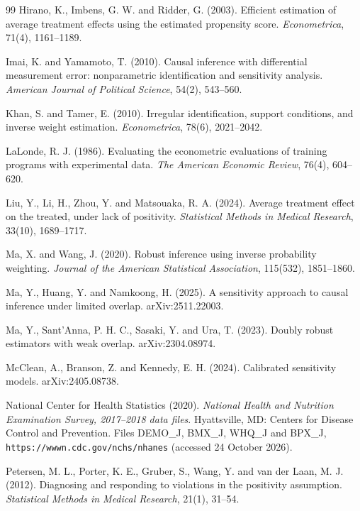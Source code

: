 \documentclass[11pt,a4paper]{article}
\theoremstyle{plain}
\theoremstyle{definition}
\begin{document}
\begin{thebibliography}{99}
 Hirano, K., Imbens, G. W. and Ridder, G. (2003). Efficient estimation of average treatment effects using the estimated propensity score. \emph{Econometrica}, 71(4), 1161--1189.

 Imai, K. and Yamamoto, T. (2010). Causal inference with differential measurement error: nonparametric identification and sensitivity analysis. \emph{American Journal of Political Science}, 54(2), 543--560.

 Khan, S. and Tamer, E. (2010). Irregular identification, support conditions, and inverse weight estimation. \emph{Econometrica}, 78(6), 2021--2042.

 LaLonde, R. J. (1986). Evaluating the econometric evaluations of training programs with experimental data. \emph{The American Economic Review}, 76(4), 604--620.

 Liu, Y., Li, H., Zhou, Y. and Matsouaka, R. A. (2024). Average treatment effect on the treated, under lack of positivity. \emph{Statistical Methods in Medical Research}, 33(10), 1689--1717.

 Ma, X. and Wang, J. (2020). Robust inference using inverse probability weighting. \emph{Journal of the American Statistical Association}, 115(532), 1851--1860.

 Ma, Y., Huang, Y. and Namkoong, H. (2025). A sensitivity approach to causal inference under limited overlap. arXiv:2511.22003.

 Ma, Y., Sant'Anna, P. H. C., Sasaki, Y. and Ura, T. (2023). Doubly robust estimators with weak overlap. arXiv:2304.08974.

 McClean, A., Branson, Z. and Kennedy, E. H. (2024). Calibrated sensitivity models. arXiv:2405.08738.

 National Center for Health Statistics (2020). \emph{National Health and Nutrition Examination Survey, 2017--2018 data files}. Hyattsville, MD: Centers for Disease Control and Prevention. Files DEMO\_J, BMX\_J, WHQ\_J and BPX\_J, \texttt{https://wwwn.cdc.gov/nchs/nhanes} (accessed 24 October 2026).

 Petersen, M. L., Porter, K. E., Gruber, S., Wang, Y. and van der Laan, M. J. (2012). Diagnosing and responding to violations in the positivity assumption. \emph{Statistical Methods in Medical Research}, 21(1), 31--54.


\end{thebibliography}
\end{document}
